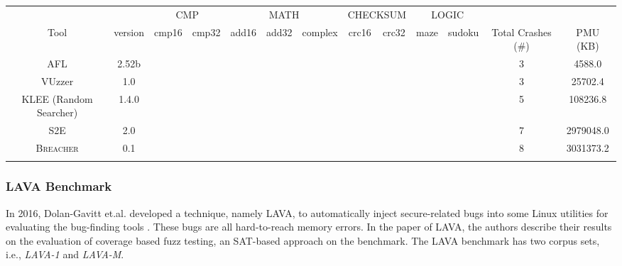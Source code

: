 \documentclass{cta-author}
\newcommand{\prototype}{\textsc{Breacher} }
\newcommand{\cmark}{\ding{51}}%
\newcommand{\xmark}{\ding{55}}%
\begin{document}
\begin{table}[!t]
	{\begin{tabular*}{20pc}{ccccccccccccc}\toprule
			&& \multicolumn{2}{c}{CMP}  & \multicolumn{3}{c}{MATH} & \multicolumn{2}{c}{CHECKSUM} 
			& 	\multicolumn{2}{c}{LOGIC} && \\ 
			Tool & version & cmp16 & cmp32 & add16 & add32 & complex & crc16 & 
			crc32 & maze & sudoku & Total Crashes (\#) & PMU (KB)\\
			\midrule
			AFL 		& 2.52b		& \cmark & \cmark & \cmark & \xmark & \xmark & \xmark & \xmark & \xmark & \xmark & 3 & 4588.0\\
			VUzzer      & 1.0       & \cmark & \cmark & \xmark & \xmark & \xmark & \xmark & \xmark & \xmark & \xmark & 3 & 25702.4\\
			KLEE (Random Searcher)		& 1.4.0		& \cmark & \cmark & \cmark & \cmark & \cmark & \xmark & \xmark & \xmark & \xmark & 5 & 108236.8\\
			S2E			& 2.0		& \cmark & \cmark & \cmark & \cmark & \cmark & \cmark & \cmark & \xmark & \xmark & 7 & 2979048.0\\
			\prototype	& 0.1		& \cmark & \cmark & \cmark & \cmark & \cmark & \cmark & \cmark & \cmark & \xmark & 8 & 3031373.2\\
			\botrule
		\end{tabular*}}{}
	\end{table}
	
\subsubsection{LAVA Benchmark}
In 2016, Dolan-Gavitt et.al. developed a technique, namely LAVA, to 
automatically inject secure-related bugs into some Linux utilities for 
evaluating the bug-finding tools \cite{dolan2016lava}. These bugs are 
all hard-to-reach memory errors. In the paper of LAVA, the authors describe 
their results on the evaluation of coverage based fuzz testing, an SAT-based 
approach on the benchmark. The LAVA benchmark has two corpus sets, 
i.e., \textit{LAVA-1} and \textit{LAVA-M}.
\end{document}
